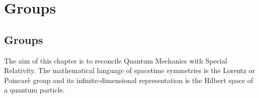 \part{Groups}

\chapter{Groups}

    The aim of this chapter is to reconcile Quantum Mechanics with Special Relativity. The mathematical language of spacetime symmetries is the Lorentz or Poincarè group and its infinite-dimensional representation is the Hilbert space of a quantum particle.

\section{}

    